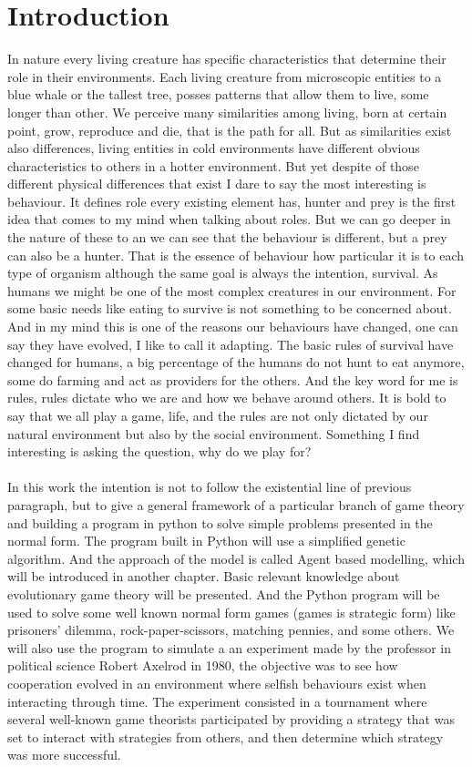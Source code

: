 \documentclass{book}
\begin{document}
\section{Introduction}
\label{Intro:Introduction}
In nature every living creature has specific characteristics that determine their role in their environments. Each living creature from microscopic entities to a blue whale or the tallest tree, posses patterns that allow them to live, some longer than other. We perceive many similarities among living, born at certain point, grow, reproduce and die, that is the path for all. But as similarities exist also differences, living entities in cold environments have different obvious characteristics to others in a hotter environment. But yet despite of those different physical differences that exist I dare to say the most interesting is behaviour. It defines role every existing element has, hunter and prey is the first idea that comes to my mind when talking about roles. But we can go deeper in the nature of these to an we can see that the behaviour is different, but a prey can also be a hunter. That is the essence of behaviour how particular it is to each type of organism although the same goal is always the intention, survival.  As humans we might be one of the most complex creatures in our environment. For some basic needs like eating to survive is not something to be concerned about. And in my mind this is one of the reasons our behaviours have changed, one can say they have evolved, I like to call it adapting. The basic rules of survival  have changed for humans, a big percentage of the humans do not hunt to eat anymore,  some do farming and act as providers for the others. And the key word for me is rules, rules dictate who we are and how we behave  around others. It is bold to say that we all play a game, life, and the rules are not only dictated by our natural environment but also by the social environment. Something I find interesting is asking the question, why do we play for?
\\\\ In this work the intention is not to follow the existential line of previous paragraph, but to give a general framework of a particular branch of game theory and building a program in python to solve simple problems presented in the normal form. The program built in Python will use a simplified genetic algorithm. And the approach of the model is called Agent based modelling, which will be introduced in another chapter. Basic relevant knowledge about evolutionary game theory will be presented. And the Python program will be used to solve some well known normal form games (games is strategic form) like prisoners' dilemma, rock-paper-scissors, matching pennies, and some others. We will also use the program to simulate a an experiment made by the professor in political science Robert Axelrod in 1980, the objective was to see how cooperation evolved in an environment where selfish behaviours exist when interacting through time. The experiment consisted in a tournament where several well-known game theorists participated by providing a strategy that was set to interact with strategies from others, and then determine which strategy was more successful.  
\end{document}
